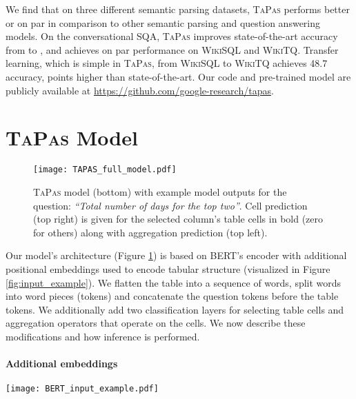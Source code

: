 \documentclass[11pt,a4paper]{article}
\newcommand\sqa{\textsc{SQA}\xspace}
\newcommand\wikisql{\textsc{WikiSQL}\xspace}
\newcommand\wtq{\textsc{WikiTQ}\xspace}
\newcommand{\ours}{\textsc{TaPas}\xspace}
\begin{document}
We find that on three different semantic parsing datasets, \ours performs better or on par in comparison to other semantic parsing and question answering models. On the conversational \sqa \cite{iyyer2017search}, \ours improves state-of-the-art accuracy from  to , and achieves on par performance on \wikisql \cite{zhong2017seq2sql} and \wtq \cite{pasupat2015compositional}. 
Transfer learning, which is simple in \ours, from \wikisql to \wtq achieves 48.7 accuracy,  points higher than state-of-the-art.
Our code and pre-trained model are publicly available at \url{https://github.com/google-research/tapas}. \section{\ours Model}
\label{sec:model}

\begin{figure}[t]
\centering
\texttt{[image: TAPAS\_full\_model.pdf]}
\caption{\ours model (bottom) with example model outputs for the question: \textit{``Total number of days for the top two''}. Cell prediction (top right) is given for the selected column's table cells in bold (zero for others) along with aggregation prediction (top left).}
\label{fig:full_model}
\end{figure}

Our model's architecture (Figure \ref{fig:full_model}) is based on BERT's encoder with additional positional embeddings used to encode tabular structure (visualized in Figure \ref{fig:input_example}). We flatten the table into a sequence of words, split words into word pieces (tokens) and concatenate the question tokens before the table tokens. We additionally add two classification layers for selecting table cells and aggregation operators that operate on the cells. We now describe these modifications and how inference is performed.

\paragraph{Additional embeddings} 

\begin{figure*}[t]
\centering
\texttt{[image: BERT\_input\_example.pdf]}
\caption{Encoding of the question ``query?'' and a simple table using the special embeddings of \ours.
The previous answer embeddings are omitted for brevity.
}
\label{fig:input_example}
\end{figure*}
\end{document}
